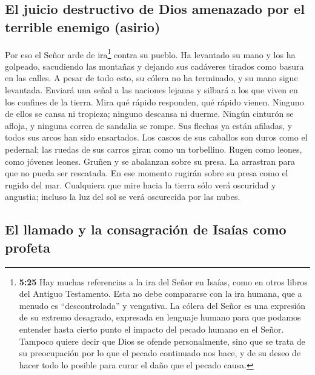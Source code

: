\hypertarget{el-juicio-destructivo-de-dios-amenazado-por-el-terrible-enemigo-asirio}{%
\subsection{El juicio destructivo de Dios amenazado por el terrible
enemigo
(asirio)}\label{el-juicio-destructivo-de-dios-amenazado-por-el-terrible-enemigo-asirio}}

 Por eso el Señor arde de ira\footnote{\textbf{5:25} Hay
  muchas referencias a la ira del Señor en Isaías, como en otros libros
  del Antiguo Testamento. Esta no debe compararse con la ira humana, que
  a menudo es ``descontrolada'' y vengativa. La cólera del Señor es una
  expresión de su extremo desagrado, expresada en lenguaje humano para
  que podamos entender hasta cierto punto el impacto del pecado humano
  en el Señor. Tampoco quiere decir que Dios se ofende personalmente,
  sino que se trata de su preocupación por lo que el pecado continuado
  nos hace, y de su deseo de hacer todo lo posible para curar el daño
  que el pecado causa.} contra su pueblo. Ha levantado su mano y los ha
golpeado, sacudiendo las montañas y dejando sus cadáveres tirados como
basura en las calles. A pesar de todo esto, su cólera no ha terminado, y
su mano sigue levantada.  Enviará una señal a las
naciones lejanas y silbará a los que viven en los confines de la tierra.
Mira qué rápido responden, qué rápido vienen.  Ninguno de
ellos se cansa ni tropieza; ninguno descansa ni duerme. Ningún cinturón
se afloja, y ninguna correa de sandalia se rompe.  Sus
flechas ya están afiladas, y todos sus arcos han sido ensartados. Los
cascos de sus caballos son duros como el pedernal; las ruedas de sus
carros giran como un torbellino.  Rugen como leones, como
jóvenes leones. Gruñen y se abalanzan sobre su presa. La arrastran para
que no pueda ser rescatada.  En ese momento rugirán sobre
su presa como el rugido del mar. Cualquiera que mire hacia la tierra
sólo verá oscuridad y angustia; incluso la luz del sol se verá
oscurecida por las nubes.

\hypertarget{el-llamado-y-la-consagraciuxf3n-de-isauxedas-como-profeta}{%
\subsection{El llamado y la consagración de Isaías como
profeta}\label{el-llamado-y-la-consagraciuxf3n-de-isauxedas-como-profeta}}

